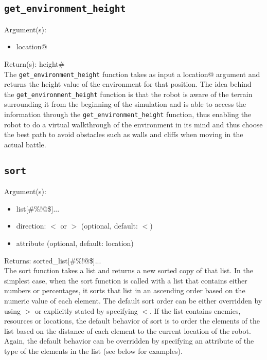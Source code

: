 \documentclass[a4paper]{article}
\begin{document}
\subsection{\texttt{get\_environment\_height}}

Argument(s):
\begin{itemize}
	\item location@
\end{itemize}

\noindent Return(s): height\#\\

The \texttt{get\_environment\_height} function takes as input a location@ argument and returns the height value of the environment for that position. The idea behind the \texttt{get\_environment\_height} function is that the robot is aware of the terrain surrounding it from the beginning of the simulation and is able to access the information through the \texttt{get\_environment\_height} function, thus enabling the robot to do a virtual walkthrough of the environment in its mind and thus choose the best path to avoid obstacles such as walls and cliffs when moving in the actual battle.

\subsection{\texttt{sort}}

Argument(s):
\begin{itemize}
	\item list[\#\%!@\$]...
	\item direction: $<$ or $>$ (optional, default: $<$)
	\item attribute (optional, default: location)
\end{itemize}

\noindent Returns: sorted\_list[\#\%!@\$]...\\

The sort function takes a list and returns a new sorted copy of that list.  In the simplest case, when the sort function is called with a list that contains either numbers or percentages, it sorts that list in an ascending order based on the numeric value of each element.  The default sort order can be either overridden by using $>$ or explicitly stated by specifying $<$.  If the list contains enemies, resources or locations, the default behavior of sort is to order the elements of the list based on the distance of each element to the current location of the robot.  Again, the default behavior can be overridden by specifying an attribute of the type of the elements in the list (see below for examples).
\end{document}
